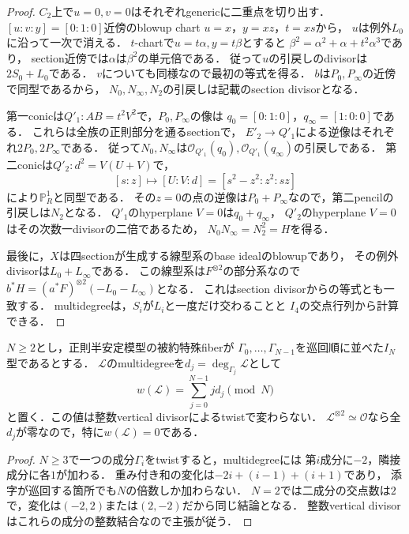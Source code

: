\begin{proof}
$C_2$上で$u=0,v=0$はそれぞれgenericに二重点を切り出す．
$[u:v:y]=[0:1:0]$近傍のblowup chart $u=x$，$y=xz$，$t=xs$から，
$u$は例外$L_0$に沿って一次で消える．
$t$-chartで$u=t\alpha,y=t\beta$とすると
$\beta^2=\alpha^2+\alpha+t^2\alpha^3$であり，
section近傍では$\alpha$は$\beta^2$の単元倍である．
従って$u$の引戻しのdivisorは$2S_0+L_0$である．
$v$についても同様なので最初の等式を得る．
$b$は$P_0,P_\infty$の近傍で同型であるから，
$N_0,N_\infty,N_2$の引戻しは記載のsection divisorとなる．

第一conicは$Q'_1:AB=t^2V^2$で，$P_0,P_\infty$の像は
$q_0=[0:1:0]$，$q_\infty=[1:0:0]$である．
これらは全族の正則部分を通るsectionで，
$E'_2\to Q'_1$による逆像はそれぞれ$2P_0,2P_\infty$である．
従って$N_0,N_\infty$は$\mathcal O_{Q'_1}(q_0),\mathcal O_{Q'_1}(q_\infty)$の引戻しである．
第二conicは$Q'_2:d^2=V(U+V)$で，
\[
 [s:z]\longmapsto[U:V:d]=[s^2-z^2:z^2:sz]
\]
により$\mathbb P^1_R$と同型である．
その$z=0$の点の逆像は$P_0+P_\infty$なので，第二pencilの引戻しは$N_2$となる．
$Q'_1$のhyperplane $V=0$は$q_0+q_\infty$，
$Q'_2$のhyperplane $V=0$はその次数一divisorの二倍であるため，
$N_0N_\infty=N_2^2=H$を得る．

最後に，$X$は四sectionが生成する線型系のbase idealのblowupであり，
その例外divisorは$L_0+L_\infty$である．
この線型系は$F^{\otimes2}$の部分系なので
$b^*H=(a^*F)^{\otimes2}(-L_0-L_\infty)$となる．
これはsection divisorからの等式とも一致する．
multidegreeは，$S_i$が$L_i$と一度だけ交わることと
$I_4$の交点行列から計算できる．
\end{proof}

\begin{lemma}[$I_N$の重み付き次数]
\label{lem:qa-cycle-weighted-degree-obstruction}
$N\ge2$とし，正則半安定模型の被約特殊fiberが
$\Gamma_0,\ldots,\Gamma_{N-1}$を巡回順に並べた$I_N$型であるとする．
$\mathcal L$のmultidegreeを$d_j=\deg_{\Gamma_j}\mathcal L$として
\[
                  w(\mathcal L)=\sum_{j=0}^{N-1}j d_j\pmod N
\]
と置く．この値は整数vertical divisorによるtwistで変わらない．
$\mathcal L^{\otimes2}\simeq\mathcal O$なら全$d_j$が零なので，特に$w(\mathcal L)=0$である．
\end{lemma}
\begin{proof}
$N\ge3$で一つの成分$\Gamma_i$をtwistすると，multidegreeには
第$i$成分に$-2$，隣接成分に各$1$が加わる．
重み付き和の変化は$-2i+(i-1)+(i+1)$であり，
添字が巡回する箇所でも$N$の倍数しか加わらない．
$N=2$では二成分の交点数は$2$で，変化は$(-2,2)$または$(2,-2)$だから同じ結論となる．
整数vertical divisorはこれらの成分の整数結合なので主張が従う．
\end{proof}

